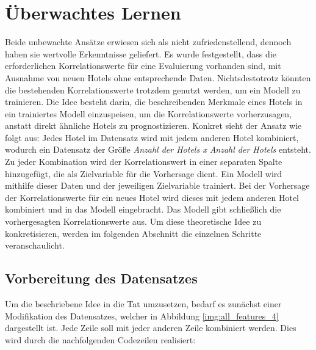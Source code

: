 \chapter{Überwachtes Lernen}
\label{subsec:lean}
Beide unbewachte Ansätze erwiesen sich als nicht zufriedenstellend, dennoch haben sie wertvolle Erkenntnisse geliefert. Es wurde festgestellt, dass die erforderlichen Korrelationswerte für eine Evaluierung vorhanden sind, mit Ausnahme von neuen Hotels ohne entsprechende Daten. Nichtsdestotrotz könnten die bestehenden Korrelationswerte trotzdem genutzt werden, um ein Modell zu trainieren. Die Idee besteht darin, die beschreibenden Merkmale eines Hotels in ein trainiertes Modell einzuspeisen, um die Korrelationswerte vorherzusagen, anstatt direkt ähnliche Hotels zu prognostizieren.
\newline
\newline
Konkret sieht der Ansatz wie folgt aus: Jedes Hotel im Datensatz wird mit jedem anderen Hotel kombiniert, wodurch ein Datensatz der Größe \emph{Anzahl der Hotels x Anzahl der Hotels} entsteht. Zu jeder Kombination wird der Korrelationswert in einer separaten Spalte hinzugefügt, die als Zielvariable für die Vorhersage dient. Ein Modell wird mithilfe dieser Daten und der jeweiligen Zielvariable trainiert. Bei der Vorhersage der Korrelationswerte für ein neues Hotel wird dieses mit jedem anderen Hotel kombiniert und in das Modell eingebracht. Das Modell gibt schließlich die vorhergesagten Korrelationswerte aus.
\newline
\newline
Um diese theoretische Idee zu konkretisieren, werden im folgenden Abschnitt die einzelnen Schritte veranschaulicht.

\section{Vorbereitung des Datensatzes}
\label{subsubsec:learn_prepare}
Um die beschriebene Idee in die Tat umzusetzen, bedarf es zunächst einer Modifikation des Datensatzes, welcher in Abbildung \ref{img:all_features_4} dargestellt ist. Jede Zeile soll mit jeder anderen Zeile kombiniert werden. Dies wird durch die nachfolgenden Codezeilen realisiert:

